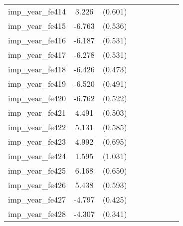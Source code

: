 {\begin{tabular}{l*{4}{cc}}
imp\_year\_fe414&    3.226\sym{***}&  (0.601)&                  &         &                  &         &                  &         \\
imp\_year\_fe415&   -6.763\sym{***}&  (0.536)&                  &         &                  &         &                  &         \\
imp\_year\_fe416&   -6.187\sym{***}&  (0.531)&                  &         &                  &         &                  &         \\
imp\_year\_fe417&   -6.278\sym{***}&  (0.531)&                  &         &                  &         &                  &         \\
imp\_year\_fe418&   -6.426\sym{***}&  (0.473)&                  &         &                  &         &                  &         \\
imp\_year\_fe419&   -6.520\sym{***}&  (0.491)&                  &         &                  &         &                  &         \\
imp\_year\_fe420&   -6.762\sym{***}&  (0.522)&                  &         &                  &         &                  &         \\
imp\_year\_fe421&    4.491\sym{***}&  (0.503)&                  &         &                  &         &                  &         \\
imp\_year\_fe422&    5.131\sym{***}&  (0.585)&                  &         &                  &         &                  &         \\
imp\_year\_fe423&    4.992\sym{***}&  (0.695)&                  &         &                  &         &                  &         \\
imp\_year\_fe424&    1.595         &  (1.031)&                  &         &                  &         &                  &         \\
imp\_year\_fe425&    6.168\sym{***}&  (0.650)&                  &         &                  &         &                  &         \\
imp\_year\_fe426&    5.438\sym{***}&  (0.593)&                  &         &                  &         &                  &         \\
imp\_year\_fe427&   -4.797\sym{***}&  (0.425)&                  &         &                  &         &                  &         \\
imp\_year\_fe428&   -4.307\sym{***}&  (0.341)&                  &         &                  &         &                  &         \\

\end{tabular}}
